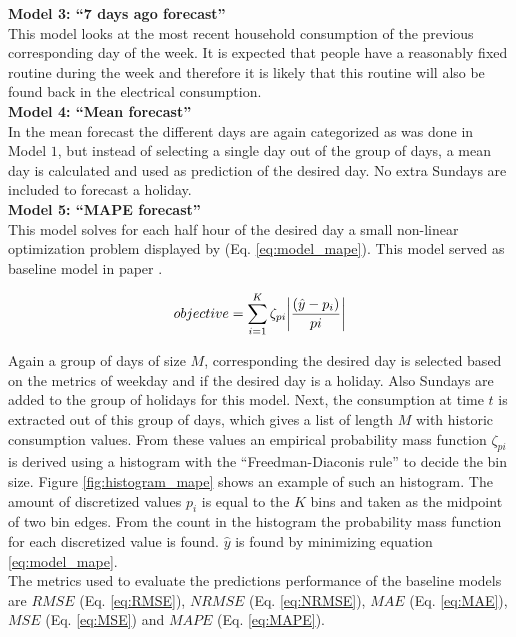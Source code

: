  \textbf{Model 3: ``7 days ago forecast''}\\
 This model looks at the most recent household consumption of the previous corresponding day of the week. It is expected that people have a reasonably fixed routine during the week and therefore it is likely that this routine will also be found back in the electrical consumption.\\
 
 \textbf{Model 4: ``Mean forecast''}\\
 In the mean forecast the different days are again categorized as was done in Model $ 1 $, but instead of selecting a single day out of the group of days, a mean day is calculated and used as prediction of the desired day. No extra Sundays are included to forecast a holiday.\\
 
 \textbf{Model 5: ``MAPE forecast'' }\\
 This model solves for each half hour of the desired day a small non-linear optimization problem displayed by (Eq. \ref{eq:model_mape}). This model served as baseline model in paper \cite{Kong2019}. 
 
 \begin{equation}\label{eq:model_mape}
 	objective = \sum_{i=1}^K \zeta_{pi}\abs{\frac{(\hat{y}-p_i)}{pi}}
 \end{equation}
 
 Again a group of days of size $ M $, corresponding the desired day is selected based on the metrics of weekday and if the desired day is a holiday. Also Sundays are added to the group of holidays for this model. Next, the consumption at time $ t $ is extracted out of this group of days, which gives a list of length $ M $ with historic consumption values. From these values an empirical probability mass function $ \zeta_{pi} $ is derived using a histogram with the ``Freedman-Diaconis rule'' to decide the bin size. Figure \ref{fig:histogram_mape} shows an example of such an histogram. The amount of discretized values $ p_i $ is equal to the $ K $ bins and taken as the midpoint of two bin edges. From the count in the histogram the probability mass function for each discretized value is found. $ \hat{y} $ is found by minimizing equation \ref{eq:model_mape}.\\
 
The metrics used to evaluate the predictions performance of the baseline models are $ RMSE $ (Eq. \ref{eq:RMSE}), $ NRMSE $ (Eq. \ref{eq:NRMSE}), $ MAE $ (Eq. \ref{eq:MAE}), $ MSE $ (Eq. \ref{eq:MSE}) and $ MAPE $ (Eq. \ref{eq:MAPE}).

